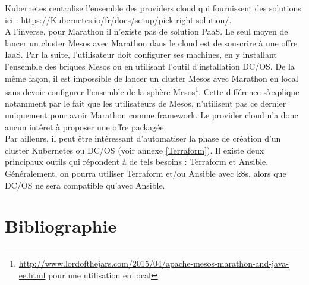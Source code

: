 \documentclass[11pt,fleqn]{book} %
\begin{document}
Kubernetes centralise l'ensemble des providers cloud qui fournissent des solutions ici : \url{https://Kubernetes.io/fr/docs/setup/pick-right-solution/}. \\

A l'inverse, pour Marathon il n'existe pas de solution PaaS. Le seul moyen de lancer un cluster Mesos avec Marathon dans le cloud est de souscrire à une offre IaaS. Par la suite, l'utilisateur doit configurer ses machines, en y installant l'ensemble des briques Mesos ou en utilisant l'outil d'installation DC/OS. De la même façon, il est impossible de lancer un cluster Mesos avec Marathon en local sans devoir configurer l'ensemble de la sphère Mesos\footnote{\url{http://www.lordofthejars.com/2015/04/apache-mesos-marathon-and-java-ee.html} pour une utilisation en local}. Cette différence s'explique notamment par le fait que les utilisateurs de Mesos, n'utilisent pas ce dernier uniquement pour avoir Marathon comme framework. Le provider cloud n'a donc aucun intêret à proposer une offre packagée.\\

Par ailleurs, il peut être intéressant d'automatiser la phase de création d'un cluster Kubernetes ou DC/OS (voir annexe \ref{Terraform}). Il existe deux principaux outils qui répondent à de tels besoins : Terraform et Ansible. Généralement, on pourra utiliser Terraform et/ou Ansible avec k8s, alors que DC/OS ne sera compatible qu'avec Ansible.


\printglossaries
{}

\chapter*{Bibliographie}
\nocite{*}
\vspace{-2cm}
\printbibliography[heading=bibempty]


\cleardoublepage
{}
\setlength{\columnsep}{0.75cm}
\printindex

\end{document}
